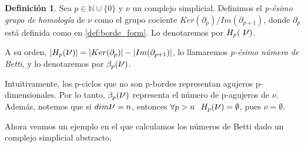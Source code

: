 \documentclass[12pt, a4paper]{article}
\numberwithin{equation}{section}
\theoremstyle{definition}
\newtheorem{defi}{Definición}
\theoremstyle{remark}
\theoremstyle{plain}
\begin{document}
	\begin{defi}
		\label{defi:homology}
		Sea $p \in \mathbb{N}\cup\{0\}$ y {\Large $\nu$} un complejo 
		simplicial. Definimos el \textit{p-ésimo grupo de homología} 
		de {\Large $\nu$} como el grupo cociente $Ker(\partial_{p})/
		Im(\partial_{p+1})$, donde $\partial_{p}$ está definida como
		en \ref{def:borde_form}. Lo denotaremos por $H_{p}(\text{
		{\Large $\nu$}})$.

		A su orden, $|H_{p}(\text{{\Large $\nu$}})|=
		|Ker(\partial_{p})|-|Im(\partial_{p+1})|$, lo 
		llamaremos \textit{p-ésimo número de Betti}, y lo denotaremos
		por $\beta_{p}(\text{{\Large $\nu$}})$.
	\end{defi}

	Intuitivamente, los p-ciclos que no son p-bordes representan agujeros
	p-dimensionales. Por lo tanto, $\beta_{p}(\text{{\Large $\nu$}})$ 
	representa el número de p-agujeros de {\Large $\nu$}. Además, notemos 
	que si $dim\text{{\Large $\nu$}}=n$, entonces $\forall p >n 
	\hspace{0.25cm} H_{p}(\text{{\Large $\nu$}})=\emptyset$, pues {\Large 
	$\nu$}$=\emptyset$.

	Ahora veamos un ejemplo en el que calculamos los números de Betti dado 
	un complejo simplicial abstracto.
\end{document}
